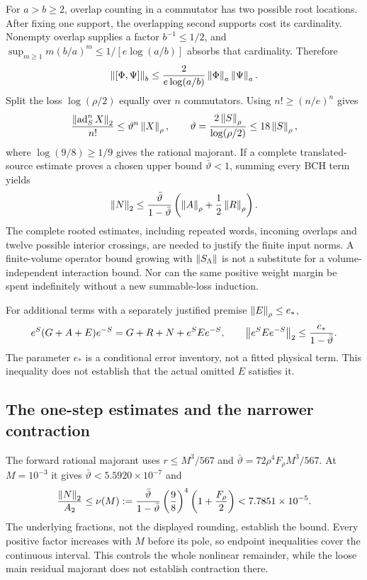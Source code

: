For $a>b\ge2$, overlap counting in a commutator has two possible root locations. After fixing one support, the overlapping second supports cost its cardinality. Nonempty overlap supplies a factor $b^{-1}\le1/2$, and
$\sup_{m\ge1}m(b/a)^m\le1/[e\log(a/b)]$ absorbs that cardinality. Therefore
\begin{equation}
\left\lVert[\Phi,\Psi]\right\rVert_b\le
\frac{2}{e\log(a/b)}\left\lVert\Phi\right\rVert_a\left\lVert\Psi\right\rVert_a.
\label{eq:loss}
\end{equation}
Split the loss $\log(\rho/2)$ equally over $n$ commutators. Using
$n!\ge(n/e)^n$ gives
\begin{equation}
\frac{\left\lVert\operatorname{ad}_S^n X\right\rVert_2}{n!}
\le\vartheta^n\left\lVert X\right\rVert_\rho,\qquad
\vartheta=\frac{2\left\lVert S\right\rVert_\rho}{\log(\rho/2)}
\le18\left\lVert S\right\rVert_\rho,
\label{eq:nested}
\end{equation}
where $\log(9/8)\ge1/9$ gives the rational majorant. If a complete translated-source estimate proves a chosen upper bound $\bar\vartheta<1$, summing every BCH term yields
\begin{equation}
\left\lVert N\right\rVert_2\le\frac{\bar\vartheta}{1-\bar\vartheta}
\left(\left\lVert A\right\rVert_\rho+\frac12\left\lVert R\right\rVert_\rho\right).
\label{eq:nonlinear}
\end{equation}
The complete rooted estimates, including repeated words, incoming overlaps and twelve possible interior crossings, are needed to justify the finite input norms. A finite-volume operator bound growing with $\left\lVert S_\Lambda\right\rVert$ is not a substitute for a volume-independent interaction bound. Nor can the same positive weight margin be spent indefinitely without a new summable-loss induction.

For additional terms with a separately justified premise $\left\lVert E\right\rVert_\rho\le e_*$,
\begin{equation}
e^S(G+A+E)e^{-S}=G+R+N+e^SEe^{-S},\qquad
\left\lVert e^SEe^{-S}\right\rVert_2\le\frac{e_*}{1-\bar\vartheta}.
\label{eq:extra}
\end{equation}
The parameter $e_*$ is a conditional error inventory, not a fitted physical term. This inequality does not establish that the actual omitted $E$ satisfies it.

\subsection{The one-step estimates and the narrower contraction}
The forward rational majorant uses $r\le M^3/567$ and
$\bar\vartheta=72\rho^4F_\rho M^3/567$. At $M=10^{-3}$ it gives
$\bar\vartheta<5.5920\times10^{-7}$ and
\begin{equation}
\frac{\left\lVert N\right\rVert_2}{A_2}\le\nu(M):=
\frac{\bar\vartheta}{1-\bar\vartheta}\left(\frac98\right)^4
\left(1+\frac{F_\rho}{2}\right)<7.7851\times10^{-5}.
\label{eq:nubudget}
\end{equation}
The underlying fractions, not the displayed rounding, establish the bound. Every positive factor increases with $M$ before its pole, so endpoint inequalities cover the continuous interval. This controls the whole nonlinear remainder, while the loose main residual majorant does not establish contraction there.

